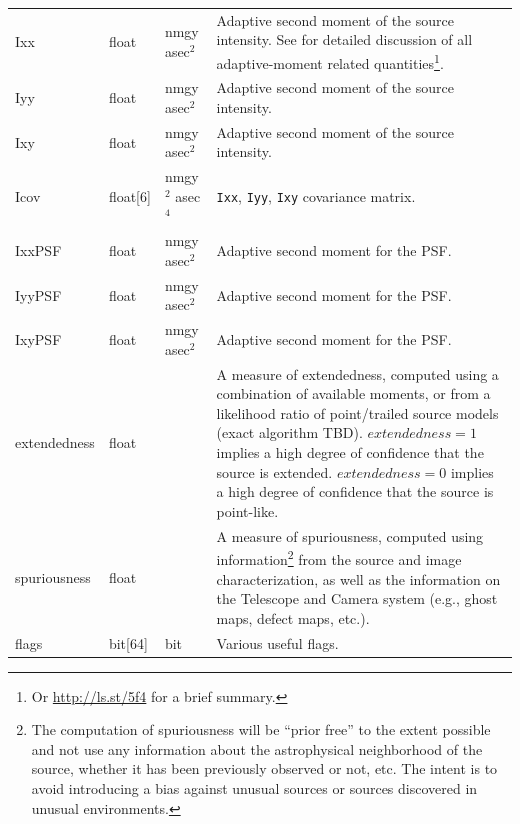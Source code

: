 \documentclass[12pt]{article}
\begin{document}
\begin{center}
\begin{longtable}{p{3cm}p{2cm}p{2cm}p{5cm}}


Ixx & float & nmgy asec$^{2}$  & Adaptive second moment of the source intensity. See \citet{2002AJ....123..583B} for detailed discussion of all adaptive-moment related quantities\footnote{Or \url{http://ls.st/5f4} for a brief summary.}. \\

Iyy & float & nmgy asec$^{2}$ & Adaptive second moment of the source intensity. \\

Ixy & float & nmgy asec$^{2}$ & Adaptive second moment of the source intensity. \\

Icov & float[6] & nmgy$^{2}$ asec$^{4}$ & {\tt Ixx}, {\tt Iyy}, {\tt Ixy} covariance matrix. \\

IxxPSF & float & nmgy asec$^{2}$ & Adaptive second moment for the PSF. \\

IyyPSF & float & nmgy asec$^{2}$ & Adaptive second moment for the PSF. \\

IxyPSF & float & nmgy asec$^{2}$ & Adaptive second moment for the PSF. \\

extendedness & float & ~ & A measure of extendedness, computed using a combination of available moments, or from a likelihood ratio of point/trailed source models (exact algorithm TBD). $extendedness=1$ implies a high degree of confidence that the source is extended. $extendedness=0$ implies a high degree of confidence that the source is point-like. \\

spuriousness & float & ~ & A measure of spuriousness, computed using information\footnote{The computation
of spuriousness will be “prior free” to the extent possible and not use any information about the astrophysical neighborhood of the source, whether it has been previously observed or not, etc. The intent is to avoid introducing
a bias against unusual sources or sources discovered in unusual environments.}
from the source and image characterization, as well as the information on the Telescope and Camera system
(e.g., ghost maps, defect maps, etc.).
\\

flags & bit[64] & bit & Various useful flags.  \\ \hline
\end{longtable}
\end{center}
\end{document}
